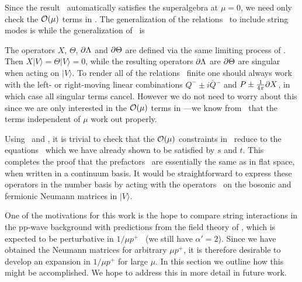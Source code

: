 Since the result \svtstring\ automatically satisfies
the superalgebra  at $\mu = 0$, we need only check
the ${\cal{O}}(\mu)$ terms in \reqalg.
The generalization of the relations \useful\ to include string modes is
\eqn{}
while the generalization of \vacact\ is
\eqn{}

The operators $X$, $\Theta$, $\partial \Lambda$ and $\partial \Theta$ are
defined via the same limiting process of \limits.
Then $X|V\rangle = \Theta|V\rangle = 0$,
while the resulting operators $\partial \Lambda$ are $\partial \Theta$ are singular
when acting on $|V\rangle$.
To render all of the relations \usefulstring\ finite
one should always work with the left- or right-moving
linear combinations $Q^- \pm i \overline{Q}{}^-$ and $P \pm {1 \over 4 \pi} \partial X$, in
which case all singular terms cancel.
However we do not need to worry about this since we
are only interested in the
${\cal{O}}(\mu)$ terms in \usefulstring---we know from \GSB\ that
the terms independent of $\mu$ work out properly.

Using  \usefulstring\ and \aajd, it is trivial to check that the
${\cal{O}}(\mu)$ constraints
in \reqalg\ reduce to the equations \eqtwo\ which we have
already shown to be satisfied by $s$ and $t$.
This completes the proof that the prefactors 
\svtstring\ are essentially the same as in flat space, when written in a
continuum basis.  It would be straightforward to express
these operators in the number basis by acting with the operators
\limits\ on the bosonic and fermionic Neumann matrices in $|V\rangle$.



One of the motivations for this work is the hope
to compare string interactions
in the pp-wave background with predictions from the field theory
of \BMN, which is expected to be perturbative in
$1/\mu p^+$ \seven\ (we still
have $\alpha'=2$).  Since we have obtained the Neumann matrices
for arbitrary $\mu p^+$, it is therefore desirable to develop an
expansion in $1/\mu p^+$ for large $\mu$.
In this section we outline how this might be accomplished.
We hope to address this in more detail in
future work.


